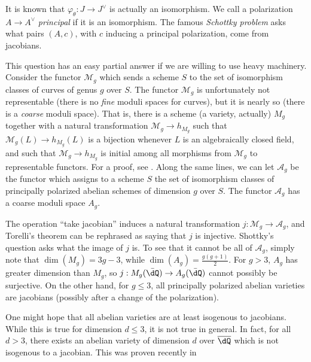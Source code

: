 It is known that $\varphi_\theta:J\to J^\vee$ is actually an isomorphism. We 
call a polarization $A\to A^\vee$ \emph{principal} if it is an isomorphism. 
The famous \emph{Schottky problem} asks 
what pairs $(A,c)$, with $c$ inducing a principal polarization, come from 
jacobians. 

This question has an easy partial answer if we are willing to use heavy 
machinery. Consider the functor $\mathcal{M}_g$ which sends a scheme $S$ to the 
set of isomorphism classes of curves of genus $g$ over $S$. The functor 
$\mathcal{M}_g$ is unfortunately not representable (there is no  
\emph{fine} moduli spaces for curves), but it is nearly so (there is a 
\emph{coarse} moduli space). That is, there is a scheme (a variety, 
actually) $M_g$ together with a natural transformation 
$\mathcal{M}_g\to h_{M_g}$ such that $\mathcal{M}_g(L)\to h_{M_g}(L)$ is a 
bijection whenever $L$ is an algebraically closed field, and such that 
$\mathcal{M}_g\to h_{M_g}$ is initial among all morphisms from $\mathcal{M}_g$ 
to representable functors. For a proof, see \cite[5]{mu94}. Along the same lines, 
we can let $\mathcal{A}_g$ be the functor which assigns to a scheme $S$ the set 
of isomorphism classes of principally polarized abelian schemes of dimension 
$g$ over $S$. The functor $\mathcal{A}_g$ has a coarse moduli space $A_g$. 

The operation ``take jacobian'' induces a natural transformation 
$j:\mathcal{M}_g\to\mathcal{A}_g$, and Torelli's theorem can be rephrased as 
saying that $j$ is injective. Shottky's question asks what the image of $j$ is. 
To see that it cannot be all of $\mathcal{A}_g$, simply note that 
$\dim(M_g) = 3 g - 3$, while $\dim(A_g) = \frac{g(g+1)}{2}$. For 
$g>3$, $A_g$ has greater dimension than $M_g$, so 
$j:M_g(\bar\dQ)\to A_g(\bar\dQ)$ cannot possibly be surjective. On the other 
hand, for $g\leqslant 3$, all principally polarized abelian varieties are 
jacobians (possibly after a change of the polarization). 

One might hope that all abelian varieties are at least isogenous to jacobians. 
While this is true for dimension $d\leqslant 3$, it is not true in general. 
In fact, for all $d>3$, there exists an abelian variety of dimension $d$ over 
$\overline{\dQ}$ which is not isogenous to a jacobian. This was proven 
recently in \cite{ts12}


